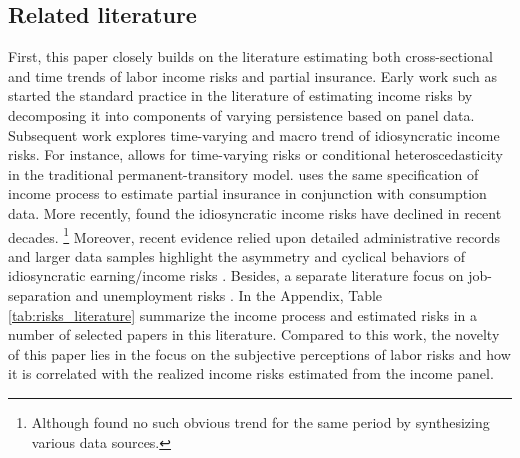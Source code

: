 
\hypertarget{related-literature}{%
\subsection{Related literature}\label{related-literature}}

First, this paper closely builds on the literature estimating both cross-sectional and time trends of labor income risks and partial insurance. Early work such as \cite{abowd1989covariance,gottschalk1994growth, carroll1997nature} started the standard practice in the literature of estimating income risks by decomposing it into components of varying persistence based on panel data. Subsequent work explores time-varying and macro trend of idiosyncratic income risks. For instance, \cite{meghir2004income} allows for time-varying risks or conditional heteroscedasticity in the traditional permanent-transitory model. \cite{blundell_consumption_2008} uses the same specification of income process to estimate partial insurance in conjunction with consumption data. More recently,  \cite{bloom2018great} found the idiosyncratic income risks have declined in recent decades. \footnote{Although  \cite{moffitt2020reconciling} found no such obvious trend for the same period by synthesizing various data sources.} Moreover, recent evidence relied upon detailed administrative records and larger data samples highlight the asymmetry and cyclical behaviors of idiosyncratic earning/income risks \citep{storesletten2004cyclical, guvenen2014nature,arellano2017earnings,guvenen2019data,bayer2019precautionary}. Besides, a separate literature focus on job-separation and unemployment risks \citep{low2010wage,davis2011recessions}. In the Appendix, Table \ref{tab:risks_literature} summarize the income process and estimated risks in a number of selected papers in this literature. Compared to this work, the novelty of this paper lies in the focus on the subjective perceptions of labor risks and how it is correlated with the realized income risks estimated from the income panel. 

